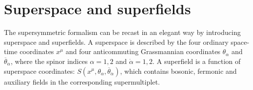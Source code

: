 \documentclass[12pt]{report}
\begin{document}
\chapter{Superspace and superfields}
The supersymmetric formalism can be recast in an elegant way by introducing superspace and superfields.
A superspace is described by the four ordinary space-time coordinates $x^{\mu}$ and four anticommuting Grassmannian coordinates $\theta_{\alpha}$ and $\overline{\theta}_{\dot{\alpha}}$, where the spinor indices $\alpha = 1, 2$ and $\dot{\alpha} = 1, 2$.
A superfield is a function of superspace coordinates: $S (x^{\mu}, \theta_{\alpha}, \overline{\theta}_{\dot{\alpha}})$, which contains bosonic, fermonic and auxiliary fields in the corresponding supermultiplet.
\end{document}
